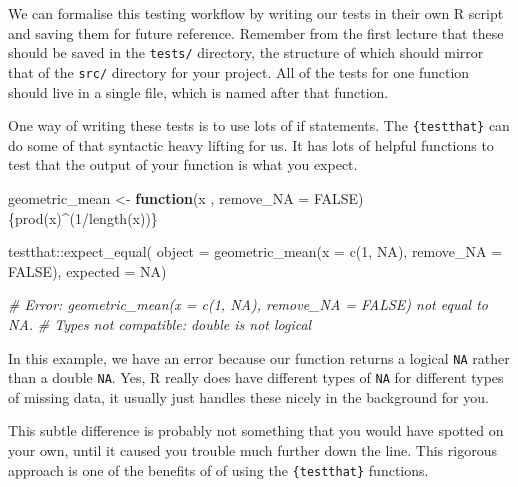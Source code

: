 \documentclass[
  12pt,
]{book}
\newenvironment{Shaded}{\begin{snugshade}}{\end{snugshade}}
\newcommand{\AttributeTok}[1]{\textcolor[rgb]{0.77,0.63,0.00}{#1}}
\newcommand{\CommentTok}[1]{\textcolor[rgb]{0.56,0.35,0.01}{\textit{#1}}}
\newcommand{\ConstantTok}[1]{\textcolor[rgb]{0.00,0.00,0.00}{#1}}
\newcommand{\ControlFlowTok}[1]{\textcolor[rgb]{0.13,0.29,0.53}{\textbf{#1}}}
\newcommand{\DecValTok}[1]{\textcolor[rgb]{0.00,0.00,0.81}{#1}}
\newcommand{\FunctionTok}[1]{\textcolor[rgb]{0.00,0.00,0.00}{#1}}
\newcommand{\NormalTok}[1]{#1}
\newcommand{\OtherTok}[1]{\textcolor[rgb]{0.56,0.35,0.01}{#1}}
\newcommand{\SpecialCharTok}[1]{\textcolor[rgb]{0.00,0.00,0.00}{#1}}
\begin{document}
We can formalise this testing workflow by writing our tests in their own R script and saving them for future reference. Remember from the first lecture that these should be saved in the \texttt{tests/} directory, the structure of which should mirror that of the \texttt{src/} directory for your project. All of the tests for one function should live in a single file, which is named after that function.

One way of writing these tests is to use lots of if statements. The \texttt{\{testthat\}} can do some of that syntactic heavy lifting for us. It has lots of helpful functions to test that the output of your function is what you expect.

\begin{Shaded}
\begin{Highlighting}[]
\NormalTok{geometric\_mean }\OtherTok{\textless{}{-}} \ControlFlowTok{function}\NormalTok{(x , }\AttributeTok{remove\_NA =} \ConstantTok{FALSE}\NormalTok{)\{}\FunctionTok{prod}\NormalTok{(x)}\SpecialCharTok{\^{}}\NormalTok{(}\DecValTok{1}\SpecialCharTok{/}\FunctionTok{length}\NormalTok{(x))\}}
\end{Highlighting}
\end{Shaded}

\begin{Shaded}
\begin{Highlighting}[]
\NormalTok{testthat}\SpecialCharTok{::}\FunctionTok{expect\_equal}\NormalTok{(}
  \AttributeTok{object =} \FunctionTok{geometric\_mean}\NormalTok{(}\AttributeTok{x =} \FunctionTok{c}\NormalTok{(}\DecValTok{1}\NormalTok{, }\ConstantTok{NA}\NormalTok{), }\AttributeTok{remove\_NA =} \ConstantTok{FALSE}\NormalTok{),}
  \AttributeTok{expected =} \ConstantTok{NA}\NormalTok{)}

\CommentTok{\# Error: geometric\_mean(x = c(1, NA), remove\_NA = FALSE) not equal to NA.}
\CommentTok{\# Types not compatible: double is not logical}
\end{Highlighting}
\end{Shaded}

In this example, we have an error because our function returns a logical \texttt{NA} rather than a double \texttt{NA}. Yes, R really does have different types of \texttt{NA} for different types of missing data, it usually just handles these nicely in the background for you.

This subtle difference is probably not something that you would have spotted on your own, until it caused you trouble much further down the line. This rigorous approach is one of the benefits of of using the \texttt{\{testthat\}} functions.
\end{document}

